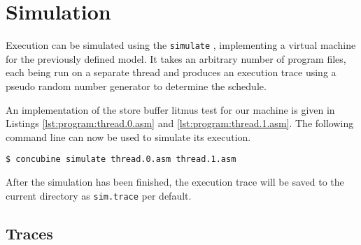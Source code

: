 \section{Simulation}

%

Execution can be simulated using the \texttt{simulate} , implementing a virtual machine for the previously defined model.
It takes an arbitrary number of program files, each being run on a separate thread and produces an execution trace using a pseudo random number generator to determine the schedule.

\begin{minipage}{.45\textwidth}
  
\end{minipage}
\begin{minipage}{.45\textwidth}
  
\end{minipage}

An implementation of the store buffer litmus test for our machine is given in Listings \ref{lst:program:thread.0.asm} and \ref{lst:program:thread.1.asm}.
The following command line can now be used to simulate its execution.

\begin{verbatim}
$ concubine simulate thread.0.asm thread.1.asm
\end{verbatim}

After the simulation has been finished, the execution trace will be saved to the current directory as \texttt{sim.trace} per default.

\subsection*{Traces}


